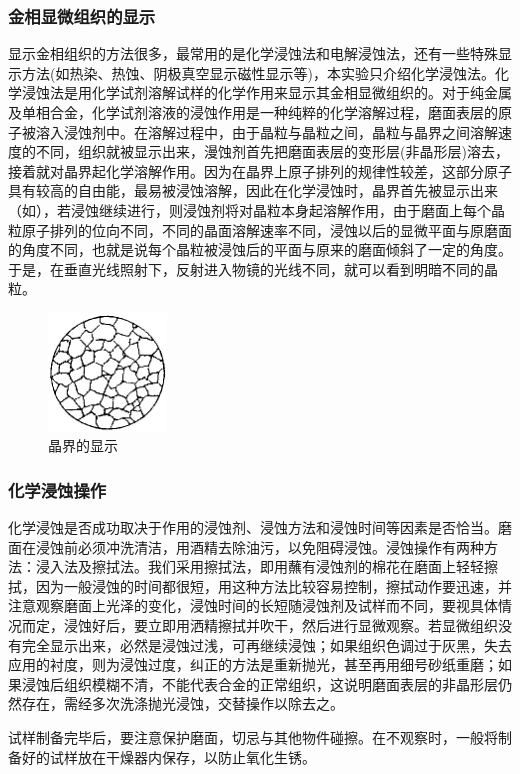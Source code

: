         \subsubsection{金相显微组织的显示}
        显示金相组织的方法很多，最常用的是化学浸蚀法和电解浸蚀法，还有一些特殊显示方法(如热染、热蚀、阴极真空显示磁性显示等)，本实验只介绍化学浸蚀法。化学浸蚀法是用化学试剂溶解试样的化学作用来显示其金相显微组织的。对于纯金属及单相合金，化学试剂溶液的浸蚀作用是一种纯粹的化学溶解过程，磨面表层的原子被溶入浸蚀剂中。在溶解过程中，由于晶粒与晶粒之间，晶粒与晶界之间溶解速度的不同，组织就被显示出来，漫蚀剂首先把磨面表层的变形层(非晶形层)溶去，接着就对晶界起化学溶解作用。因为在晶界上原子排列的规律性较差，这部分原子具有较高的自由能，最易被浸蚀溶解，因此在化学浸蚀时，晶界首先被显示出来（如），若浸蚀继续进行，则浸蚀剂将对晶粒本身起溶解作用，由于磨面上每个晶粒原子排列的位向不同，不同的晶面溶解速率不同，浸蚀以后的显微平面与原磨面的角度不同，也就是说每个晶粒被浸蚀后的平面与原来的磨面倾斜了一定的角度。于是，在垂直光线照射下，反射进入物镜的光线不同，就可以看到明暗不同的晶粒。
        \begin{figure}[!ht]
            \caption{晶界的显示\label{fig:jingjie}}
            \includegraphics[width=0.28\textwidth]{img/A2/jingjie.png}
        \end{figure}
        \subsubsection{化学浸蚀操作}
        化学浸蚀是否成功取决于作用的浸蚀剂、浸蚀方法和浸蚀时间等因素是否恰当。磨面在浸蚀前必须冲洗清洁，用酒精去除油污，以免阻碍浸蚀。浸蚀操作有两种方法：浸入法及擦拭法。我们采用擦拭法，即用蘸有浸蚀剂的棉花在磨面上轻轻擦拭，因为一般浸蚀的时间都很短，用这种方法比较容易控制，擦拭动作要迅速，并注意观察磨面上光泽的变化，浸蚀时间的长短随浸蚀剂及试样而不同，要视具体情况而定，浸蚀好后，要立即用洒精擦拭并吹干，然后进行显微观察。若显微组织没有完全显示出来，必然是浸蚀过浅，可再继续浸蚀；如果组织色调过于灰黑，失去应用的衬度，则为浸蚀过度，纠正的方法是重新抛光，甚至再用细号砂纸重磨；如果浸蚀后组织模糊不清，不能代表合金的正常组织，这说明磨面表层的非晶形层仍然存在，需经多次洗涤抛光浸蚀，交替操作以除去之。\par
        试样制备完毕后，要注意保护磨面，切忌与其他物件碰擦。在不观察时，一般将制备好的试样放在干燥器内保存，以防止氧化生锈。
